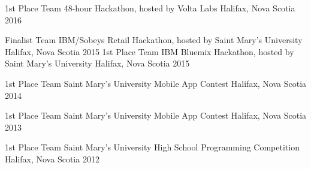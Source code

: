 



\begin{cvhonors}

  \cvhonor
    {1st Place Team} %
    {48-hour Hackathon, hosted by Volta Labs} %
    {Halifax, Nova Scotia} %
    {2016} %

  \cvhonor
    {Finalist Team} %
    {IBM/Sobeys Retail Hackathon, hosted by Saint Mary's University} %
    {Halifax, Nova Scotia} %
    {2015} %
  \cvhonor
    {1st Place Team} %
    {IBM Bluemix Hackathon, hosted by Saint Mary's University} %
    {Halifax, Nova Scotia} %
    {2015} %

  \cvhonor
    {1st Place Team} %
    {Saint Mary's University Mobile App Contest} %
    {Halifax, Nova Scotia} %
    {2014} %

  \cvhonor
    {1st Place Team} %
    {Saint Mary's University Mobile App Contest} %
    {Halifax, Nova Scotia} %
    {2013} %

  \cvhonor
    {1st Place Team} %
    {Saint Mary's University High School Programming Competition} %
    {Halifax, Nova Scotia} %
    {2012} %


\end{cvhonors}
